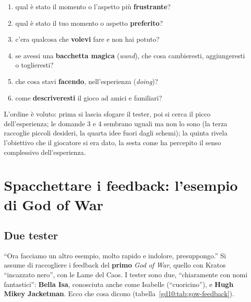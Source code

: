 \begin{enumerate}
  \item qual è stato il momento o l'aspetto più \textbf{frustrante}?
  \item qual è stato il tuo momento o aspetto \textbf{preferito}?
  \item c'era qualcosa che \textbf{volevi} fare e non hai potuto?
  \item se avessi una \textbf{bacchetta magica} (\emph{wand}), che cosa
        cambieresti, aggiungeresti o toglieresti?
  \item che cosa stavi \textbf{facendo}, nell'esperienza (\emph{doing})?
  \item come \textbf{descriveresti} il gioco ad amici e familiari?
\end{enumerate}
L'ordine è voluto: prima si lascia sfogare il tester, poi si cerca il picco
dell'esperienza; le domande 3 e 4 sembrano uguali ma non lo sono (la terza
raccoglie piccoli desideri, la quarta idee fuori dagli schemi); la quinta
rivela l'obiettivo che il giocatore si era dato, la sesta come ha percepito
il senso complessivo dell'esperienza.

\section{Spacchettare i feedback: l'esempio di God of War}
\label{gd10:sec:spacchettare}

\subsection{Due tester}

``Ora facciamo un altro esempio, molto rapido e indolore, presuppongo.'' Si
assume di raccogliere i feedback del \textbf{primo} \emph{God of War}, quello
con Kratos ``incazzato nero'', con le Lame del Caos. I tester sono due,
``chiaramente con nomi fantastici'': \textbf{Bella Isa}, conosciuta anche
come Isabelle (``cuoricino''), e \textbf{Hugh Mikey Jacketman}. Ecco che
cosa dicono (tabella~\ref{gd10:tab:gow-feedback}).

